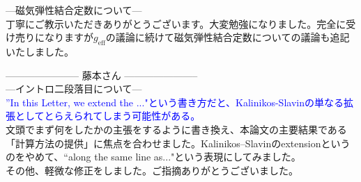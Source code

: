 \documentclass{jsarticle}
\begin{document}
---磁気弾性結合定数について---\\
丁寧にご教示いただきありがとうございます。大変勉強になりました。完全に受け売りになりますが$g_{\mathrm{eff}}$の議論に続けて磁気弾性結合定数についての議論も追記いたしました。


-----------------------
藤本さん
-----------------------\\

---イントロ二段落目について---\\
\textcolor{blue}{''In this Letter, we extend the ..."という書き方だと、Kalinikos-Slavinの単なる拡張としてとらえられてしまう可能性がある。}\\

文頭でまず何をしたかの主張をするように書き換え、本論文の主要結果である「計算方法の提供」に焦点を合わせました。Kalinikos--Slavinのextensionというのをやめて、``along the same line as..."という表現にしてみました。\\


その他、軽微な修正をしました。ご指摘ありがとうございました。


\end{document}

